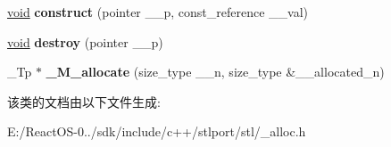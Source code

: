 \begin{DoxyCompactItemize}
\hyperlink{interfacevoid}{void} {\bfseries construct} (pointer \+\_\+\+\_\+p, const\+\_\+reference \+\_\+\+\_\+val)
\item 
\mbox{\label{classallocator_a5d8119b8a470bd5a5facbc6c0a8b11d5}} 
\hyperlink{interfacevoid}{void} {\bfseries destroy} (pointer \+\_\+\+\_\+p)
\item 
\mbox{\label{classallocator_a467e4cdb680d1017da34311f1350e986}} 
\+\_\+\+Tp $\ast$ {\bfseries \+\_\+\+M\+\_\+allocate} (size\+\_\+type \+\_\+\+\_\+n, size\+\_\+type \&\+\_\+\+\_\+allocated\+\_\+n)
\end{DoxyCompactItemize}


该类的文档由以下文件生成\+:\begin{DoxyCompactItemize}
\item 
E\+:/\+React\+O\+S-\/0../sdk/include/c++/stlport/stl/\+\_\+alloc.\+h\end{DoxyCompactItemize}
